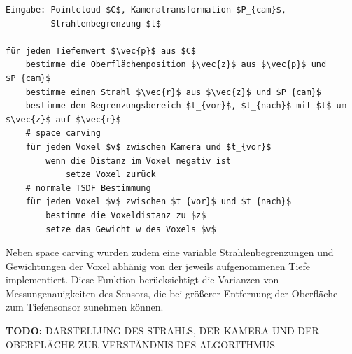 \begin{lstlisting}[mathescape,caption=Chisel TSDF Algorithmus, label=lst:chisel, float=htbp]
Eingabe: Pointcloud $C$, Kameratransformation $P_{cam}$, 
         Strahlenbegrenzung $t$

für jeden Tiefenwert $\vec{p}$ aus $C$
    bestimme die Oberflächenposition $\vec{z}$ aus $\vec{p}$ und $P_{cam}$
    bestimme einen Strahl $\vec{r}$ aus $\vec{z}$ und $P_{cam}$
    bestimme den Begrenzungsbereich $t_{vor}$, $t_{nach}$ mit $t$ um $\vec{z}$ auf $\vec{r}$
    # space carving
    für jeden Voxel $v$ zwischen Kamera und $t_{vor}$
        wenn die Distanz im Voxel negativ ist
            setze Voxel zurück
    # normale TSDF Bestimmung
    für jeden Voxel $v$ zwischen $t_{vor}$ und $t_{nach}$
        bestimme die Voxeldistanz zu $z$
        setze das Gewicht w des Voxels $v$
\end{lstlisting}

Neben space carving wurden zudem eine variable Strahlenbegrenzungen und Gewichtungen der Voxel abhänig von der jeweils aufgenommenen Tiefe implementiert. Diese Funktion berücksichtigt die Varianzen von Messungenauigkeiten des Sensors, die bei größerer Entfernung der Oberfläche zum Tiefensonsor zunehmen können. \citep{Klingensmith_2015_7924}

\textbf{TODO:} DARSTELLUNG DES STRAHLS, DER KAMERA UND DER OBERFLÄCHE ZUR VERSTÄNDNIS DES ALGORITHMUS